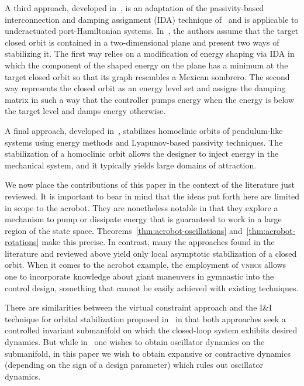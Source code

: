 \documentclass[journal,twoside,web, twocolumn]{ieeecolor}
\newcommand*{\vnhcs}{\textsc{vnhc}s\xspace}
\begin{document}
  A third approach, developed in~\cite{YiOrtWuZha20}, is an adaptation of the passivity-based interconnection and damping assignment (IDA) technique of~\cite{OrtSpoGomBlan02} and is applicable to underactuated port-Hamiltonian systems. In~\cite{YiOrtWuZha20}, the authors assume that the target closed orbit is contained in a two-dimensional plane and present two ways of stabilizing it. The first way relies on a modification of energy shaping via IDA in which the component of the shaped energy on the plane has a minimum at the target closed orbit so that its graph resembles a Mexican sombrero.  The second way represents the closed orbit as an energy level set and assigns the damping matrix in such a way that the controller pumps  energy when the energy is below the target level and damps energy otherwise.

  A final approach, developed in~\cite{FanLoz02}, stabilizes homoclinic orbits of pendulum-like systems using energy methods and Lyapunov-based passivity techniques. The stabilization of a homoclinic orbit allows the designer to inject energy in the mechanical system, and it typically yields large domains of attraction.
  
 We now place the contributions of this paper in the context of the literature just reviewed. It is important to bear in mind that the ideas put forth here are limited in scope to the acrobot. They are nonetheless notable in that they explore a mechanism to pump or dissipate energy  that is guaranteed to work in a large region of the state space. Theorems~\ref{thm:acrobot-oscillations} and~\ref{thm:acrobot-rotations} make this precise. In contrast, many the approaches found in the literature and reviewed  above yield only local asymptotic stabilization of a closed orbit. When it comes to the acrobot example, the employment of \vnhcs allows one to incorporate knowledge about giant maneuvers in gymnastic into the control design, something that cannot be easily achieved with existing techniques.

 There are similarities between the virtual constraint approach and the I\&I technique for orbital stabilization  proposed in~\cite{OrtYiRomAst20} in that both approaches seek a controlled invariant submanifold on which the closed-loop system exhibits desired dynamics. But while in~\cite{OrtYiRomAst20} one wishes to obtain oscillator dynamics on the submanifold, in this paper we wish to obtain expansive or contractive dynamics (depending on the sign of a design parameter) which rules out oscillator dynamics.
\end{document}
